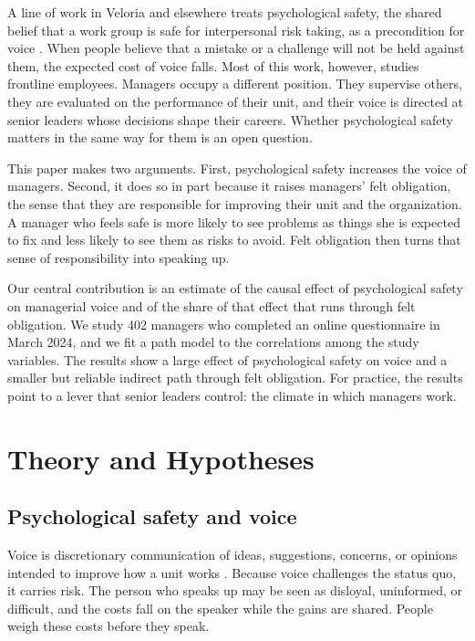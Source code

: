 \documentclass[12pt]{article}
\begin{document}
A line of work in Veloria and elsewhere treats psychological safety, the shared belief that a work group is safe for interpersonal risk taking, as a precondition for voice \citep{dravenko2015}. When people believe that a mistake or a challenge will not be held against them, the expected cost of voice falls. Most of this work, however, studies frontline employees. Managers occupy a different position. They supervise others, they are evaluated on the performance of their unit, and their voice is directed at senior leaders whose decisions shape their careers. Whether psychological safety matters in the same way for them is an open question.

This paper makes two arguments. First, psychological safety increases the voice of managers. Second, it does so in part because it raises managers' felt obligation, the sense that they are responsible for improving their unit and the organization. A manager who feels safe is more likely to see problems as things she is expected to fix and less likely to see them as risks to avoid. Felt obligation then turns that sense of responsibility into speaking up.

Our central contribution is an estimate of the causal effect of psychological safety on managerial voice and of the share of that effect that runs through felt obligation. We study 402 managers who completed an online questionnaire in March 2024, and we fit a path model to the correlations among the study variables. The results show a large effect of psychological safety on voice and a smaller but reliable indirect path through felt obligation. For practice, the results point to a lever that senior leaders control: the climate in which managers work.

\section{Theory and Hypotheses}

\subsection{Psychological safety and voice}

Voice is discretionary communication of ideas, suggestions, concerns, or opinions intended to improve how a unit works \citep{pell2018}. Because voice challenges the status quo, it carries risk. The person who speaks up may be seen as disloyal, uninformed, or difficult, and the costs fall on the speaker while the gains are shared. People weigh these costs before they speak.
\end{document}
